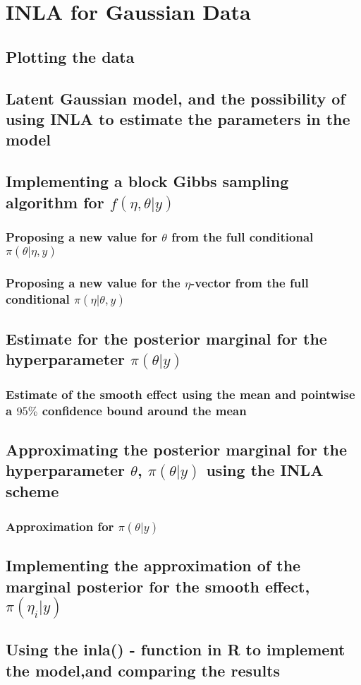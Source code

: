 \section{INLA for Gaussian Data}

\subsection{Plotting the data}

\subsection{Latent Gaussian model, and the possibility of using INLA to estimate the parameters in the model}

\subsection{Implementing a block Gibbs sampling algorithm for $f(\eta, \theta |y)$}

\subsubsection{Proposing a new value for $\theta$ from the full conditional $\pi(\theta | \eta,y)$}

\subsubsection{Proposing a new value for the $\eta$-vector from the full conditional $\pi(\eta | \theta, y)$}

\subsection{Estimate for the posterior marginal for the hyperparameter $\pi(\theta|y)$}

\subsubsection{Estimate of the smooth effect using the mean and pointwise a $95 \%$ confidence bound around the mean}

\subsection{Approximating the posterior marginal for the hyperparameter $\theta$, $\pi(\theta|y)$ using the INLA scheme}

\subsubsection{Approximation for $\pi(\theta|y)$}

\subsection{Implementing the approximation of the marginal posterior for the smooth effect, $\pi(\eta_i | y)$}

\subsection{Using the inla() - function in R to implement the model,and comparing the results}

